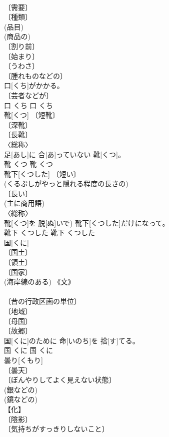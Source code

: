 \documentclass[8pt]{extreport}
\begin{document}
\begin{CJK}{UTF8}{min}
\\	〔需要〕 
\\	〔種類〕 
\\	(品目) 
\\	(商品の) 
\\	〔割り前〕 
\\	〔始まり〕 
\\	〔うわさ〕 
\\	〔腫れものなどの〕 
\\	口[くち]がかかる。	
\\	〔芸者などが〕 
\\	口	くち	口	くち	
\\	靴[くつ]	〔短靴〕 
\\	〔深靴〕 
\\	〔長靴〕 
\\	〈総称〉 
\\	足[あし]に 合[あ]っていない 靴[くつ]。	
\\	靴	くつ	靴	くつ	
\\	靴下[くつした]	〔短い〕 
\\	(くるぶしがやっと隠れる程度の長さの) 
\\	〔長い〕 
\\	(主に商用語) 
\\	〈総称〉 
\\	靴[くつ]を 脱[ぬ]いで) 靴下[くつした]だけになって。	
\\	靴下	くつした	靴下	くつした	
\\	国[くに]	
\\	〔国土〕 
\\	〔領土〕 
\\	〔国家〕 
\\	(海岸線のある) 《文》 
\\	[⇒くにぐに] 
\\	〔昔の行政区画の単位〕 
\\	〔地域〕 
\\	〔母国〕 
\\	〔故郷〕 
\\	国[くに]のために 命[いのち]を 捨[す]てる。	
\\	国	くに	国	くに	
\\	曇り[くもり]	
\\	〔曇天〕 
\\	〔ぼんやりしてよく見えない状態〕 
\\	(銀などの) 
\\	(鏡などの) 
\\	【化】 
\\	〔陰影〕 
\\	〔気持ちがすっきりしないこと〕 

\end{CJK}
\end{document}
